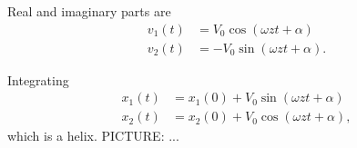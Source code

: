 {Real and imaginary parts are
%
\begin{equation}\label{eqn:relativisticElectrodynamicsT3:800}
\begin{aligned}
v_1(t) &= V_0 \cos( \omega z t + \alpha) \\
v_2(t) &= -V_0 \sin( \omega z t + \alpha).
\end{aligned}
\end{equation}

Integrating
\begin{equation}\label{eqn:relativisticElectrodynamicsT3:820}
\begin{aligned}
x_1(t) &= x_1(0) + V_0 \sin( \omega z t + \alpha) \\
x_2(t) &= x_2(0) + V_0 \cos( \omega z t + \alpha),
\end{aligned}
\end{equation}
which is a helix.
PICTURE: ...
} %
